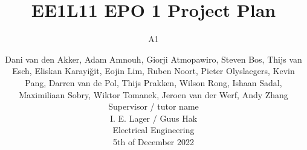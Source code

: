 \documentclass[whitelogo,oneside]{TUD-report2020}
\begin{document}


\title[tudelft-white]{\Huge{EE1L11 EPO 1 Project Plan}}
\subtitle[tudelft-black]{A1}

\author[tudelft-white]{\Large{Dani van den Akker, Adam Amnouh, Giorji Atmopawiro, Steven Bos, Thijs van Esch, Eliskan Karayi\u git, Eojin Lim, Ruben Noort, Pieter Olyslaegers, Kevin Pang, Darren van de Pol, Thijs Prakken, Wilson Rong, Ishaan Sadal, Maximiliaan Sobry, Wiktor Tomanek, Jeroen van der Werf, Andy Zhang\\ \newline
Supervisor / tutor name \\
I. E. Lager / Guus Hak\\
Electrical Engineering \\
5th of December 2022}}
  
 
\makecover
% 

% 

\tableofcontents

\mainmatter









\appendix


%

\printbibliography
\end{document}
